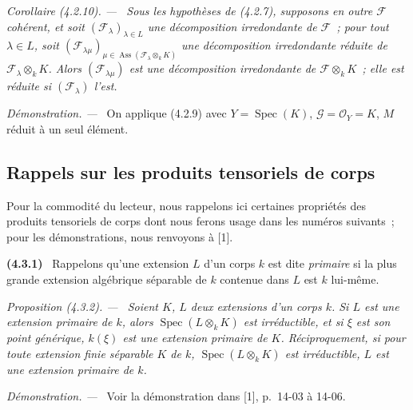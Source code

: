 \documentclass[10pt,oneside]{book}
\newcommand{\oldpage}[2][]{%
  \setcounter{footnote}{0}%
  \marginpar{\scriptsize\textbf{#1}~|~#2}\ignorespaces}
\newenvironment{env}[1][]{\par\medskip\noindent\textbf{(#1)}\ }{\par}
\newenvironment{proposition}[1][]{%
  \par\medskip\noindent\itshape Proposition (#1). ---\ }{\par}
\newenvironment{corollary}[1][]{%
  \par\medskip\noindent\itshape Corollaire (#1). ---\ }{\par}
\newenvironment{proof}{%
  \par\medskip\noindent\textit{Démonstration. ---\ }}{\par}
\begin{document}
\begin{corollary}[4.2.10]
\label{IV.2.4.2.10-fr}
Sous les hypothèses de (4.2.7), supposons en outre $\mathcal F$ cohérent, et
soit $(\mathcal F_\lambda)_{\lambda\in L}$ une décomposition irredondante de
$\mathcal F$~; pour tout $\lambda\in L$, soit
$(\mathcal F_{\lambda\mu})_{\mu\in
\operatorname{Ass}(\mathcal F_\lambda\otimes_k K)}$ une décomposition
irredondante réduite de $\mathcal F_\lambda\otimes_k K$. Alors
$(\mathcal F_{\lambda\mu})$ est une décomposition irredondante de
$\mathcal F\otimes_k K$~; elle est réduite si $(\mathcal F_\lambda)$ l'est.
\end{corollary}

\begin{proof}
On applique (4.2.9) avec $Y=\operatorname{Spec}(K)$,
$\mathcal G=\mathcal O_Y=K$, $M$ réduit à un seul élément.
\end{proof}

\oldpage[IV-2]{58}

\subsection{Rappels sur les produits tensoriels de corps}
\label{subsection:IV.2.4.3-fr}

Pour la commodité du lecteur, nous rappelons ici certaines propriétés des
produits tensoriels de corps dont nous ferons usage dans les numéros suivants~;
pour les démonstrations, nous renvoyons à [1].

\begin{env}[4.3.1]
\label{IV.2.4.3.1-fr}
Rappelons qu'une extension $L$ d'un corps $k$ est dite \emph{primaire} si la
plus grande extension algébrique séparable de $k$ contenue dans $L$ est
$k$ lui-même.
\end{env}

\begin{proposition}[4.3.2]
\label{IV.2.4.3.2-fr}
Soient $K$, $L$ deux extensions d'un corps $k$. Si $L$ est une extension
primaire de $k$, alors $\operatorname{Spec}(L\otimes_k K)$ est irréductible,
et si $\xi$ est son point générique, $k(\xi)$ est une extension primaire de
$K$. Réciproquement, si pour toute extension finie séparable $K$ de $k$,
$\operatorname{Spec}(L\otimes_k K)$ est irréductible, $L$ est une extension
primaire de $k$.
\end{proposition}

\begin{proof}
Voir la démonstration dans [1], p.~14-03 à 14-06.
\end{proof}
\end{document}
